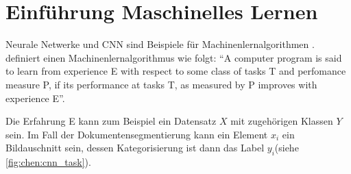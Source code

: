 \section{Einführung Maschinelles Lernen}
Neurale Netwerke und CNN sind Beispiele für Machinenlernalgorithmen .
\cite{MitchellMachinelearning1997} definiert einen Machinenlernalgorithmus wie folgt: ``A computer program is said to learn from experience E with respect to some class of tasks T and perfomance measure P, if its performance at tasks T, as measured by P improves with experience E''.

Die Erfahrung E kann zum Beispiel ein Datensatz \(X\) mit zugehörigen Klassen
\(Y\) sein. Im Fall der Dokumentensegmentierung kann ein Element \(x_i\) ein Bildauschnitt sein, 
dessen Kategorisierung ist dann das Label \(y_i\)(siehe \cref{fig:chen:cnn_task}).
